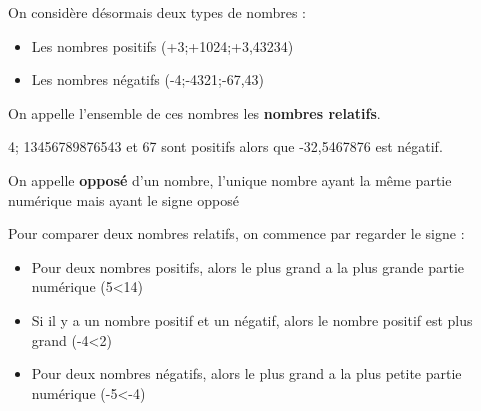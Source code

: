 {On considère désormais deux types de nombres :
\begin{itemize}
    \item Les nombres positifs (+3;+1024;+3,43234)
    \item Les nombres négatifs (-4;-4321;-67,43)
\end{itemize}
On appelle l'ensemble de ces nombres les \textbf{nombres relatifs}.}



\exmpl
{4; 13456789876543 et 67 sont positifs alors que -32,5467876 est négatif.
    }

{On appelle \textbf{opposé} d'un nombre, l'unique nombre ayant la même partie numérique mais ayant le signe opposé}




{
    Pour comparer deux nombres relatifs, on commence par regarder le signe :
    \begin{itemize}
        \item Pour deux nombres positifs, alors le plus grand a la plus grande partie numérique (5<14)
        \item Si il y a un nombre positif et un négatif, alors le nombre positif est plus grand (-4<2)
        \item Pour deux nombres négatifs, alors le plus grand a la plus petite partie numérique (-5<-4)
    \end{itemize}
}


